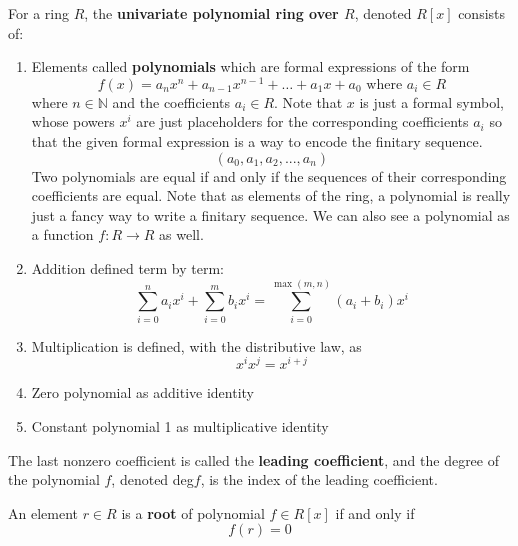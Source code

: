   \begin{definition}
    For a ring $R$, the \textbf{univariate polynomial ring over $R$}, denoted $R[x]$ consists of:
    \begin{enumerate}
      \item Elements called \textbf{polynomials} which are formal expressions of the form 
      \begin{equation}
        f(x) = a_nx^n + a_{n-1}x^{n-1} + \dots + a_1x + a_0 \text{ where } a_i \in R
      \end{equation}
      where $n \in \mathbb{N}$ and the coefficients $a_i \in R$. Note that $x$ is just a formal symbol, whose powers $x^i$ are just placeholders for the corresponding coefficients $a_i$ so that the given formal expression is a way to encode the finitary sequence. 
      \begin{equation}
        (a_0, a_1, a_2, ..., a_n)
      \end{equation}
      Two polynomials are equal if and only if the sequences of their corresponding coefficients are equal. Note that as elements of the ring, a polynomial is really just a fancy way to write a finitary sequence. We can also see a polynomial as a function $f: R \rightarrow R$ as well. 

      \item Addition defined term by term:
      \begin{equation}
        \sum_{i=0}^n a_ix^i + \sum_{i=0}^m b_ix^i = \sum_{i=0}^{\max(m,n)} (a_i + b_i)x^i
      \end{equation}

      \item Multiplication is defined, with the distributive law, as 
      \begin{equation}
        x^ix^j = x^{i+j}
      \end{equation}
      \item Zero polynomial as additive identity
      \item Constant polynomial 1 as multiplicative identity
    \end{enumerate}
    The last nonzero coefficient is called the \textbf{leading coefficient}, and the degree of the polynomial $f$, denoted deg$f$, is the index of the leading coefficient.
  \end{definition} 

  \begin{definition}
    An element $r \in R$ is a \textbf{root} of polynomial $f \in R[x]$ if and only if 
    \begin{equation}
      f(r) = 0
    \end{equation}
  \end{definition}

